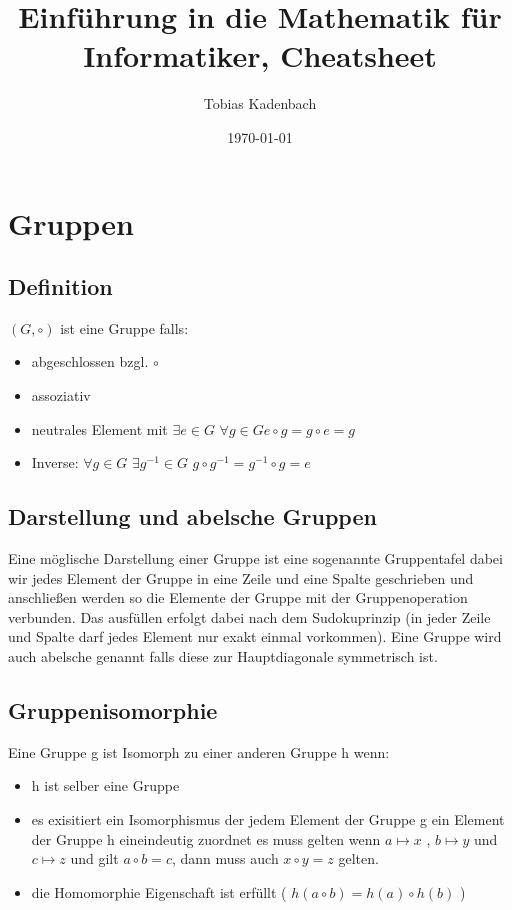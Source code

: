 \documentclass[12pt, letterpaper, twoside]{article}
\title{Einführung in die Mathematik für Informatiker, Cheatsheet}
\author{Tobias Kadenbach}
\date{\today}
\begin{document}
\maketitle

\tableofcontents 

\section{Gruppen}
\subsection{Definition}
$ (G, \circ) $ ist eine Gruppe falls:
\begin{itemize}
	\item abgeschlossen bzgl. $ \circ $
	\item assoziativ
	\item neutrales Element mit $ \exists e \in G $ $\forall g \in G e \circ g = g \circ e = g $
	\item Inverse: $ \forall g \in G $  $\exists g^{-1}  \in G $ $g \circ g^{-1} = g^{-1} \circ g = e $
\end{itemize}
\subsection{Darstellung und abelsche Gruppen}
\noindent
Eine möglische Darstellung einer Gruppe ist eine sogenannte Gruppentafel dabei wir jedes Element der Gruppe in eine Zeile und eine Spalte geschrieben und anschließen werden so die Elemente der Gruppe mit der Gruppenoperation verbunden. Das ausfüllen erfolgt dabei nach dem Sudokuprinzip (in jeder Zeile und Spalte darf jedes Element nur exakt einmal vorkommen).  
Eine Gruppe wird auch abelsche genannt falls diese zur Hauptdiagonale symmetrisch ist. \\

\subsection{Gruppenisomorphie}
\noindent
Eine Gruppe g ist Isomorph zu einer anderen Gruppe h wenn:
\begin{itemize}
	\item h ist selber eine Gruppe
	\item es exisitiert ein Isomorphismus der jedem Element der Gruppe g ein Element der Gruppe h eineindeutig zuordnet es muss gelten wenn $a \mapsto x$ , $b \mapsto y$ und $c \mapsto z$ und gilt $a \circ b = c$, dann muss auch $x \circ y = z$ gelten.
	\item die Homomorphie Eigenschaft ist erfüllt ( $ h(a \circ b) = h(a) \circ h(b) $ )
\end{itemize}
\end{document}
